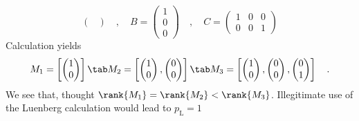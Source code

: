 \begin{example}
\begin{equation}
\begin{pmatrix}
\end{pmatrix}
\quad , \quad B = \begin{pmatrix}
1\\0\\0
\end{pmatrix}
\quad , \quad C = \begin{pmatrix}
1&0&0 \\ 0&0&1
\end{pmatrix}
\end{equation}
Calculation yields 
\begin{equation}
M_1 = \left[\begin{pmatrix} 1 \\0 \end{pmatrix}\right] 
\tab 
M_2 =\left[\begin{pmatrix} 1 \\0 \end{pmatrix},\begin{pmatrix} 0 \\0 \end{pmatrix}\right] 
\tab M_3 = 
\left[\begin{pmatrix} 1 \\0 \end{pmatrix},\begin{pmatrix} 0 \\0 \end{pmatrix},
\begin{pmatrix} 0 \\1 \end{pmatrix}\right] \quad .
\end{equation}
We see that, thought $\rank{M_1} = \rank{M_2} < \rank{M_3}$. Illegitimate use of the 
Luenberg calculation would lead to $p_\text{L}=1$

\end{example}